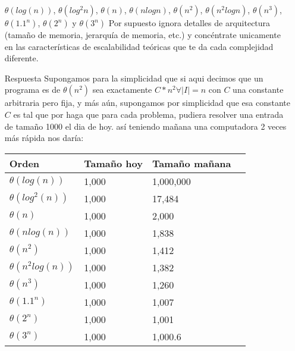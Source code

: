 \documentclass[12pt]{article}
\begin{document}
\begin{itemize}
$\theta(log(n))$, $\theta(log^2 n)$, $\theta(n)$, $\theta(nlogn)$, $\theta(n^2)$, $\theta(n^2logn)$, $\theta(n^3)$, $\theta(1.1^n )$, $\theta(2^n)$ y $\theta(3^n)$ Por supuesto ignora detalles de arquitectura (tamaño de memoria, jerarquía de memoria, etc.) y concéntrate unicamente en las características de escalabilidad teóricas que te da cada complejidad diferente.

\item[Respuesta] Supongamos para la simplicidad que si aqui decimos que un programa es de $\theta(n^2)$ sea exactamente $C*n^2 \forall |I|=n$ con $C$ una constante arbitraria pero fija, y más aún, supongamos por simplicidad que esa constante $C$ es tal que por haga que para cada problema, pudiera resolver una entrada de tamaño 1000 el dia de hoy.
así teniendo mañana una computadora 2 veces más rápida nos daría:

\begin{tabular}{ | l | l | l | l  |}
  \hline
Orden   & Tamaño hoy  &  Tamaño mañana\\
  \hline
$\theta(log(n))$  & 1,000    & 1,000,000\\
$\theta(log^2(n))$ & 1,000   &    17,484\\
$\theta(n)$       & 1,000    &     2,000\\
$\theta(nlog(n))$   & 1,000  &     1,838\\
$\theta(n^2)$     & 1,000    &     1,412\\
$\theta(n^2log(n))$ & 1,000  &     1,382\\
$\theta(n^3)$     & 1,000    &     1,260\\ 
$\theta(1.1^n )$  & 1,000    &     1,007\\
$\theta(2^n)$     & 1,000    &     1,001\\
$\theta(3^n)$     & 1,000    &   1,000.6\\ 
  \hline  
\end{tabular}

\end{itemize}
\end{document}
